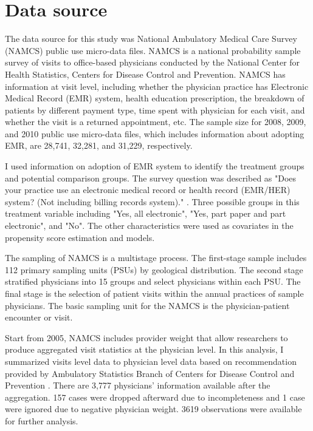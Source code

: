 \documentclass[12pt]{report}
\begin{document}
\chapter{Data source}
The data source for this study was National Ambulatory Medical Care Survey (NAMCS) public use micro-data files. NAMCS is a national probability sample survey of visits to office-based physicians conducted by the National Center for Health Statistics, Centers for Disease Control and Prevention. NAMCS has information at visit level, including whether the physician practice has Electronic Medical Record (EMR) system, health education prescription, the breakdown of patients by different payment type, time spent with physician for each visit, and whether the visit is a returned appointment, etc. The sample size for 2008, 2009, and 2010 public use micro-data files, which includes information about adopting EMR, are 28,741, 32,281, and 31,229, respectively.

I used information on adoption of EMR system to identify the treatment groups and potential comparison groups. The survey question was described as "Does your practice use an electronic medical record or health record (EMR/HER) system? (Not including billing records system)." \citep{NAMCSDOC2010}. Three possible groups in this treatment variable including "Yes, all electronic", "Yes, part paper and part electronic", and "No". The other characteristics were used as covariates in the propensity score estimation and models.

The sampling of NAMCS is a multistage process. The first-stage sample includes 112 primary sampling units (PSUs) by geological distribution. The second stage stratified physicians into 15 groups and select physicians within each PSU. The final stage is the selection of patient visits within the annual practices of sample physicians. The basic sampling unit for the NAMCS is the physician-patient encounter or visit. 

Start from 2005, NAMCS includes provider weight that allow researchers to produce aggregated visit statistics at the physician level. In this analysis, I summarized visits level data to physician level data based on recommendation provided by Ambulatory Statistics Branch of Centers for Disease Control and Prevention \citep{SasProcedure}. There are 3,777 physicians' information available after the aggregation. 157 cases were dropped afterward due to incompleteness and 1 case were ignored due to negative physician weight. 3619 observations were available for further analysis. 
\end{document}
